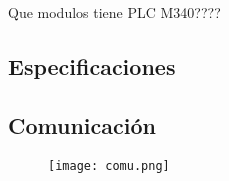 Que modulos tiene PLC M340????
\subsection{Especificaciones}
\subsection{Comunicación}
	\begin{figure}[htb]
		\centering
		\texttt{[image: comu.png]}
	\end{figure}

	\newpage